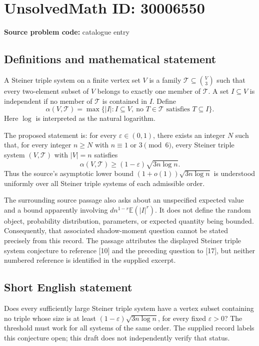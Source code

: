 \documentclass[11pt]{article}
\begin{document}
\section*{UnsolvedMath ID: 30006550}
\textbf{Source problem code:} catalogue entry
\subsection{Definitions and mathematical statement}
A Steiner triple system on a finite vertex set \(V\) is a family \(\mathcal{T}\subseteq\binom{V}{3}\) such that every two-element subset of \(V\) belongs to exactly one member of \(\mathcal{T}\). A set \(I\subseteq V\) is independent if no member of \(\mathcal{T}\) is contained in \(I\). Define
\[
\alpha(V,\mathcal{T})=\max\{|I|:I\subseteq V,\ \text{no }T\in\mathcal{T}\text{ satisfies }T\subseteq I\}.
\]
Here \(\log\) is interpreted as the natural logarithm.

The proposed statement is: for every \(\varepsilon\in(0,1)\), there exists an integer \(N\) such that, for every integer \(n\geq N\) with \(n\equiv1\) or \(3\pmod 6\), every Steiner triple system \((V,\mathcal{T})\) with \(|V|=n\) satisfies
\[
\alpha(V,\mathcal{T})\geq(1-\varepsilon)\sqrt{3n\log n}.
\]
Thus the source's asymptotic lower bound \((1+o(1))\sqrt{3n\log n}\) is understood uniformly over all Steiner triple systems of each admissible order.

The surrounding source passage also asks about an unspecified expected value and a bound apparently involving \(d n^{1-r}\mathbb{E}(|I|^r)\). It does not define the random object, probability distribution, parameters, or expected quantity being bounded. Consequently, that associated shadow-moment question cannot be stated precisely from this record. The passage attributes the displayed Steiner triple system conjecture to reference [10] and the preceding question to [17], but neither numbered reference is identified in the supplied excerpt.
\subsection{Short English statement}
Does every sufficiently large Steiner triple system have a vertex subset containing no triple whose size is at least \((1-\varepsilon)\sqrt{3n\log n}\), for every fixed \(\varepsilon>0\)? The threshold must work for all systems of the same order. The supplied record labels this conjecture open; this draft does not independently verify that status.
\end{document}
